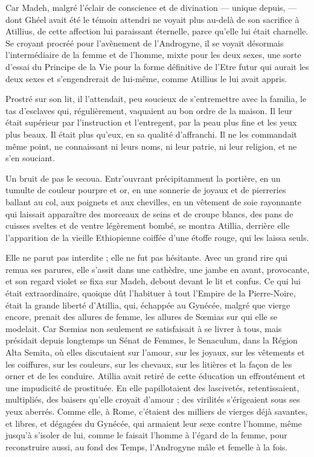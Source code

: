 \documentclass[a4paper, 11pt, oneside, polutonikogreek, french]{article}
\begin{document}
Car Madeh, malgré l'éclair de conscience et de divination --- unique depuis, --- dont Ghéel avait été le témoin attendri ne voyait plus au-delà de son sacrifice à Atillius, de cette affection lui paraissant éternelle, parce qu'elle lui était charnelle. Se croyant procréé pour l'avènement de l'Androgyne, il se voyait désormais l'intermédiaire de la femme et de l'homme, mixte pour les deux sexes, une sorte d'essai du Principe de la Vie pour la forme définitive de l'Etre futur qui aurait les deux sexes et s'engendrerait de lui-même, comme Atillius le lui avait appris.

Prostré sur son lit, il l'attendait, peu soucieux de s'entremettre avec la familia, le tas d'esclaves qui, régulièrement, vaquaient au bon ordre de la maison. Il leur était supérieur par l'instruction et l'entregent, par la peau plus fine et les yeux plus beaux. Il était plus qu'eux, en sa qualité d'affranchi. Il ne les commandait même point, ne connaissant ni leurs noms, ni leur patrie, ni leur religion, et ne s'en souciant.

Un bruit de pas le secoua. Entr'ouvrant précipitamment la portière, en un tumulte de couleur pourpre et or, en une sonnerie de joyaux et de pierreries ballant au col, aux poignets et aux chevilles, en un vêtement de soie rayonnante qui laissait apparaître des morceaux de seins et de croupe blancs, des pans de cuisses sveltes et de ventre légèrement bombé, se montra Atillia, derrière elle l'apparition de la vieille Ethiopienne coiffée d'une étoffe rouge, qui les laissa seuls.

Elle ne parut pas interdite ; elle ne fut pas hésitante. Avec un grand rire qui remua ses parures, elle s'assit dans une cathèdre, une jambe en avant, provocante, et son regard violet se fixa sur Madeh, debout devant le lit et confus. Ce qui lui était extraordinaire, quoique dût l'habituer à tout l'Empire de la Pierre-Noire, était la grande liberté d'Atillia, qui, échappée au Gynécée, malgré que vierge encore, prenait des allures de femme, les allures de Sœmias sur qui elle se modelait. Car Sœmias non seulement se satisfaisait à se livrer à tous, mais présidait depuis longtemps un Sénat de Femmes, le Senaculum, dans la Région Alta Semita, où elles discutaient sur l'amour, sur les joyaux, sur les vêtements et les coiffures, sur les couleurs, sur les chevaux, sur les litières et la façon de les orner et de les conduire. Atillia avait retiré de cette éducation un effrontément et une impudicité de prostituée. En elle papillotaient des lascivetés, retentissaient, multipliés, des baisers qu'elle croyait d'amour ; des virilités s'érigeaient sous ses yeux aberrés. Comme elle, à Rome, c'étaient des milliers de vierges déjà savantes, et libres, et dégagées du Gynécée, qui armaient leur sexe contre l'homme, même jusqu'à s'isoler de lui, comme le faisait l'homme à l'égard de la femme, pour reconstruire aussi, au fond des Temps, l'Androgyne mâle et femelle à la fois.
\end{document}
